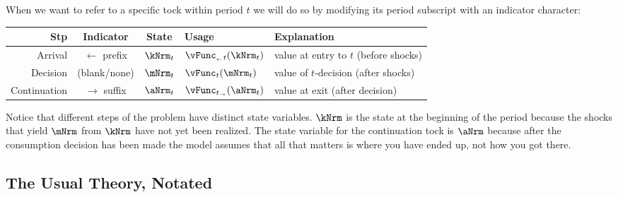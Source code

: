 \documentclass[titlepage, headings=optiontotocandhead]{Resources/texmf-local/tex/latex/econtex}
\begin{document}
When we want to refer to a specific {tock} within period $t$ we will do so by modifying its {period} subscript with an indicator character:
\begin{center}
    \begin{tabular}{r|c|c|l|l}
      Stp          & Indicator               & State          & Usage                       & Explanation                                \\ \hline
      {Arrival}      & ${\leftarrow}$ prefix & $\kNrm_{t}$ & $\vFunc_{_\leftarrow t}({\kNrm}_{t})$ & value at entry to $t$ (before shocks) \\
      {Decision}     & (blank/none)            & $\mNrm_{t}$ & $\vFunc_{{t}}({\mNrm}_{t})$ & value of $t$-decision (after shocks)       \\
      {Continuation} & ${\rightarrow}$ suffix & $\aNrm_{t}$ & $\vFunc_{t_\rightarrow}({\aNrm}_{t})$ & value at exit (after decision)
    \end{tabular}
\end{center}

Notice that different steps of the problem have distinct state variables.  $\kNrm$ is the state at the beginning of the period because the shocks that yield $\mNrm$ from $\kNrm$ have not yet been realized. The state variable for the continuation {tock} is $\aNrm$ because after the consumption decision has been made the model assumes that all that matters is where you have ended up, not how you got there.

\subsection{The Usual Theory, Notated}
\end{document}
